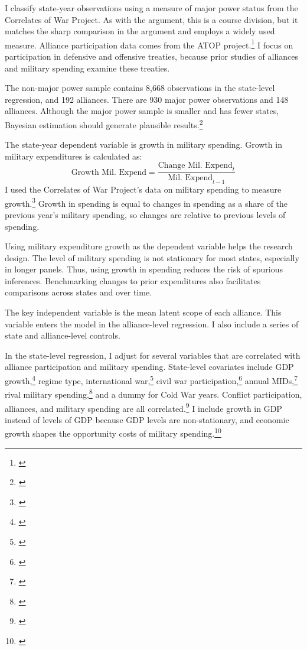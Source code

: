 \documentclass[12pt]{article}
\begin{document}
I classify state-year observations using a measure of major power status from the Correlates of War Project. 
As with the argument, this is a course division, but it matches the sharp comparison in the argument and employs a widely used measure. 
Alliance participation data comes from the ATOP project.\footnote{\cite{Leedsetal2002}} 
I focus on participation in defensive and offensive treaties, because prior studies of alliances and military spending examine these treaties. 


The non-major power sample contains 8,668 observations in the state-level regression, and 192 alliances. 
There are 930 major power observations and 148 alliances. 
Although the major power sample is smaller and has fewer states, Bayesian estimation should generate plausible results.\footnote{\cite{Stegmueller2013}} 


The state-year dependent variable is growth in military spending.
Growth in military expenditures is calculated as:
\begin{equation}
\mbox{Growth Mil. Expend} = \frac{ \mbox{Change Mil. Expend}_t }{ \mbox{Mil. Expend}_{t-1} }
\end{equation} 
I used the Correlates of War Project's data on military spending to measure growth.\footnote{\cite{SingerCINC1988}} 
Growth in spending is equal to changes in spending as a share of the previous year's military spending, so changes are relative to previous levels of spending. 


Using military expenditure growth as the dependent variable helps the research design. 
The level of military spending is not stationary for most states, especially in longer panels. 
Thus, using growth in spending reduces the risk of spurious inferences.
Benchmarking changes to prior expenditures also facilitates comparisons across states and over time. 


The key independent variable is the mean latent scope of each alliance. 
This variable enters the model in the alliance-level regression. 
I also include a series of state and alliance-level controls. 


In the state-level regression, I adjust for several variables that are correlated with alliance participation and military spending. 
State-level covariates include GDP growth,\footnote{\cite{Boltetal2018}} regime type, international war,\footnote{\cite{Reiteretal2016}} civil war participation,\footnote{\cite{SarkeesWayman2010}} annual MIDs,\footnote{\cite{Gibleretal2016}} rival military spending,\footnote{\cite{ThompsonDreyer2012}} and a dummy for Cold War years.
Conflict participation, alliances, and military spending are all correlated.\footnote{\cite{SeneseVasquez2008}}
I include growth in GDP instead of levels of GDP because GDP levels are non-stationary, and economic growth shapes the opportunity costs of military spending.\footnote{\cite{Kimball2010, Zielinskietal2017}} 
\end{document}
